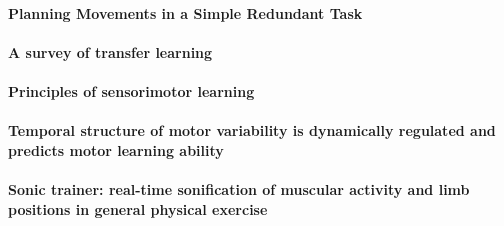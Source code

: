 \documentclass[11pt]{article}
\begin{document}
\paragraph{Planning Movements in a Simple Redundant Task} \citep{vetter_planning_2002}


\paragraph{A survey of transfer learning} \citep{weiss_survey_2016}

\paragraph{Principles of sensorimotor learning} \citep{wolpert_principles_2011}


\paragraph{Temporal structure of motor variability is dynamically regulated and predicts motor learning ability} \citep{wu_temporal_2014}


\paragraph{Sonic trainer: real-time sonification of muscular activity and limb positions in general physical exercise} \citep{yang_sonic_2013}

\newpage


\end{document}

